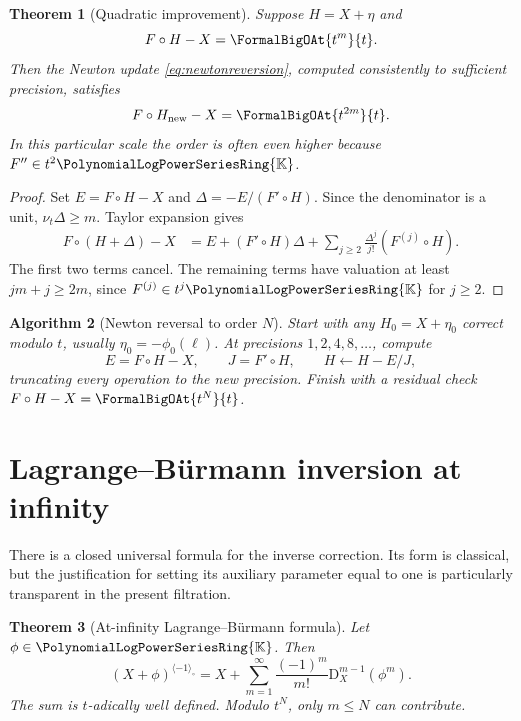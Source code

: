 \documentclass[11pt,oneside,openany]{book}
\newtheorem{theorem}{Theorem}[chapter]
\newtheorem{algorithm}[theorem]{Algorithm}
\newcommand{\K}{\mathbb{K}}
\newcommand{\Rring}{\PolynomialLogPowerSeriesRing{\K}}
\newcommand{\ordt}{\nu_t}
\newcommand{\compose}{\mathbin{\circ}}
\newcommand{\rev}{^{\langle-1\rangle_{\circ}}}
\newcommand{\D}{\mathrm{D}}
\begin{document}
\begin{theorem}[Quadratic improvement]\label{thm:newtonreverse}
Suppose \(H=X+\eta\) and
\[
 F\compose H-X=\FormalBigOAt{t^m}{t}.
\]
Then the Newton update \cref{eq:newtonreversion}, computed consistently to
sufficient precision, satisfies
\[
 F\compose H_{\mathrm{new}}-X=\FormalBigOAt{t^{2m}}{t}.
\]
In this particular scale the order is often even higher because
\(F''\in t^2\Rring\).
\end{theorem}

\begin{proof}
Set \(E=F\compose H-X\) and
\(\Delta=-E/(F'\compose H)\).  Since the denominator is a unit,
\(\ordt\Delta\geq m\).  Taylor expansion gives
\begin{align*}
 F\compose(H+\Delta)-X
 &=E+(F'\compose H)\Delta
   +\sum_{j\geq2}\frac{\Delta^j}{j!}(F^{(j)}\compose H).
\end{align*}
The first two terms cancel.  The remaining terms have valuation at least
\(jm+j\geq2m\), since \(F^{(j)}\in t^j\Rring\) for \(j\geq2\).
\end{proof}

\begin{algorithm}[Newton reversal to order \(N\)]\label{alg:newtonreverse}
Start with any \(H_0=X+\eta_0\) correct modulo \(t\), usually
\(\eta_0=-\phi_0(\ell)\).  At precisions \(1,2,4,8,\ldots\), compute
\[
 E=F\compose H-X,
 \qquad
 J=F'\compose H,
 \qquad
 H\leftarrow H-E/J,
\]
truncating every operation to the new precision.  Finish with a residual check
\(F\compose H-X=\FormalBigOAt{t^N}{t}\).
\end{algorithm}

\section{Lagrange--Bürmann inversion at infinity}
There is a closed universal formula for the inverse correction.  Its form is
classical, but the justification for setting its auxiliary parameter equal to
one is particularly transparent in the present filtration.

\begin{theorem}[At-infinity Lagrange--Bürmann formula]
\label{thm:lagrangeinfinity}
Let \(\phi\in\Rring\).  Then
\begin{equation}\label{eq:lagrangeinfinity}
 (X+\phi)\rev
 =X+\sum_{m=1}^{\infty}
   \frac{(-1)^m}{m!}\D_X^{m-1}\!\left(\phi^m\right).
\end{equation}
The sum is \(t\)-adically well defined.  Modulo \(t^N\), only
\(m\leq N\) can contribute.
\end{theorem}
\end{document}
